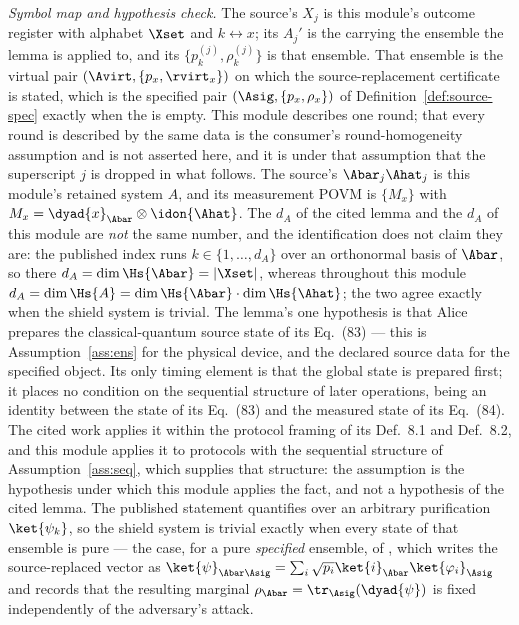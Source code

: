 \begin{fact}
\emph{Symbol map and hypothesis check.} The source's $X_j$ is this module's
outcome register with alphabet $\Xset$ and $k\leftrightarrow x$; its $A_j'$
is the  carrying the ensemble the lemma is applied to,
and its $\{p^{(j)}_k,\rho^{(j)}_k\}$ is that ensemble. That ensemble is the
virtual pair $(\Avirt,\{p_x,\rvirt_x\})$ on which the source-replacement
certificate is stated, which is the specified pair $(\Asig,\{p_x,\rho_x\})$
of Definition~\ref{def:source-spec} exactly when the  is empty.
This module describes one round; that every round is described by the
same data is the consumer's round-homogeneity assumption and is not
asserted here, and it is under that assumption that the superscript $j$ is
dropped in what follows. The source's $\Abar_j\Ahat_j$ is this module's
retained system $A$, and its measurement POVM is $\{M_x\}$ with
$M_x=\dyad{x}_{\Abar}\otimes\idon{\Ahat}$. The $d_A$ of the cited lemma and
the $d_A$ of this module are \emph{not} the same number, and the
identification does not claim they
are: the published index runs $k\in\{1,\dots,d_A\}$ over an orthonormal
basis of $\Abar$, so there $d_A=\dim\Hs{\Abar}=|\Xset|$, whereas throughout
this module $d_A=\dim\Hs{A}=\dim\Hs{\Abar}\cdot\dim\Hs{\Ahat}$; the two
agree exactly when the shield system is trivial. The lemma's one hypothesis
is that Alice prepares the classical-quantum source state of its
Eq.~(83) --- this is Assumption~\ref{ass:ens} for the physical device, and
the declared source data for the specified object. Its only timing element is
that the global state is prepared first; it places no condition on the
sequential structure of later operations, being an identity between the state
of its Eq.~(83) and the measured state of its Eq.~(84). The cited work
applies it within the protocol framing of its Def.~8.1 and Def.~8.2, and this
module applies it to protocols with the sequential structure of
Assumption~\ref{ass:seq}, which supplies that structure: the assumption is the
hypothesis under which this module applies the fact, and not a hypothesis of
the cited lemma. The
published statement quantifies over an
arbitrary purification $\ket{\psi_k}$, so the shield system is trivial
exactly when every state of that ensemble is pure --- the case, for a pure
\emph{specified} ensemble, of \cite[Eqs.~(37)--(39)]{winick2018reliable},
which writes the source-replaced vector as
$\ket{\psi}_{\Abar\Asig}=\sum_i\sqrt{p_i}\ket{i}_{\Abar}\ket{\varphi_i}_{\Asig}$
and records that the resulting marginal
$\rho_{\Abar}=\tr_{\Asig}(\dyad{\psi})$ is fixed independently of the
adversary's attack.
\end{fact}
